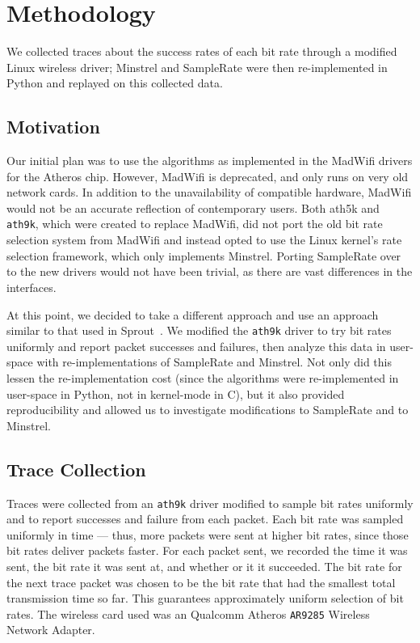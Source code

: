 \documentclass[twocolumn,10pt]{article}
\begin{document}
\section{Methodology} \label{sec:methodology}

We collected traces about the success rates of each bit rate through a
modified Linux wireless driver; Minstrel and SampleRate were then
re-implemented in Python and replayed on this collected data.

\subsection{Motivation}

Our initial plan was to use the algorithms as implemented in the
MadWifi drivers for the Atheros chip.  However, MadWifi is deprecated,
and only runs on very old network cards.  In addition to the
unavailability of compatible hardware, MadWifi would not be an
accurate reflection of contemporary users.  Both ath5k and
\texttt{ath9k}, which were created to replace MadWifi, did not port
the old bit rate selection system from MadWifi and instead opted to
use the Linux kernel's rate selection framework, which only implements
Minstrel.  Porting SampleRate over to the new drivers would not have
been trivial, as there are vast differences in the interfaces.

At this point, we decided to take a different approach and use an
approach similar to that used in Sprout~\cite{sprout}.  We modified
the \texttt{ath9k} driver to try bit rates uniformly and report packet
successes and failures, then analyze this data in user-space with
re-implementations of SampleRate and Minstrel.  Not only did this
lessen the re-implementation cost (since the algorithms were
re-implemented in user-space in Python, not in kernel-mode in C), but
it also provided reproducibility and allowed us to investigate
modifications to SampleRate and to Minstrel.

\subsection{Trace Collection}

Traces were collected from an \texttt{ath9k} driver modified to sample
bit rates uniformly and to report successes and failure from each packet.  
Each bit rate was sampled uniformly in time --- thus, more packets 
were sent at higher bit rates, since those bit rates deliver
packets faster. For each packet sent, we recorded the time it was sent,
the bit rate it was sent at, and whether or it it succeeded. The bit rate 
for the next trace packet was chosen to be the bit rate that had
the smallest total transmission time so far.  This guarantees approximately
uniform selection of bit rates.  The wireless card used was an
Qualcomm Atheros \texttt{AR9285} Wireless Network Adapter.
\end{document}

